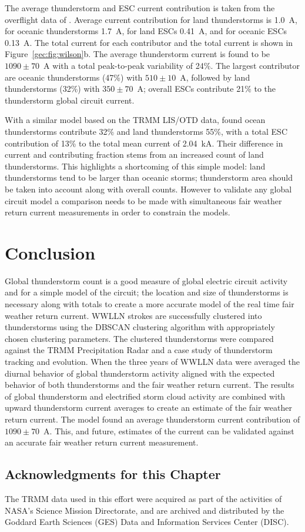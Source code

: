 The average thunderstorm and ESC current contribution is taken from the overflight data of \citet{Mach2010}.
Average current contribution for land thunderstorms is 1.0~A, for oceanic thunderstorms 1.7~A, for land ESCs 0.41~A, and for oceanic ESCs 0.13~A.
The total current for each contributor and the total current is shown in Figure~\ref{gec:fig:wilson}b.
The average thunderstorm current is found to be $1090 \pm 70$~A with a total peak-to-peak variability of 24\%.
The largest contributor are oceanic thunderstorms (47\%) with $510 \pm 10$~A, followed by land thunderstorms (32\%) with $350 \pm 70$~A; overall ESCs contribute 21\% to the thunderstorm global circuit current.

With a similar model based on the TRMM LIS/OTD data, \citet{Mach2011} found ocean thunderstorms contribute 32\% and land thunderstorms 55\%, with a total ESC contribution of 13\% to the total mean current of 2.04~kA.
Their difference in current and contributing fraction stems from an increased count of land thunderstorms.
This highlights a shortcoming of this simple model: land thunderstorms tend to be larger than oceanic storms; thunderstorm area should be taken into account along with overall counts.
However to validate any global circuit model a comparison needs to be made with simultaneous fair weather return current measurements in order to constrain the models.

\section{Conclusion}

Global thunderstorm count is a good measure of global electric circuit activity and for a simple model of the circuit; the location and size of thunderstorms is necessary along with totals to create a more accurate model of the real time fair weather return current.
WWLLN strokes are successfully clustered into thunderstorms using the DBSCAN clustering algorithm with appropriately chosen clustering parameters.
The clustered thunderstorms were compared against the TRMM Precipitation Radar and a case study of thunderstorm tracking and evolution.
When the three years of WWLLN data were averaged the diurnal behavior of global thunderstorm activity aligned with the expected behavior of both thunderstorms and the fair weather return current.
The results of global thunderstorm and electrified storm cloud activity are combined with upward thunderstorm current averages to create an estimate of the fair weather return current.
The model found an average thunderstorm current contribution of $1090 \pm 70$~A.
This, and future, estimates of the current can be validated against an accurate fair weather return current measurement.

\subsection*{Acknowledgments for this Chapter}
The TRMM data used in this effort were acquired as part of the activities of NASA's Science Mission Directorate, and are archived and distributed by the Goddard Earth Sciences (GES) Data and Information Services Center (DISC).
